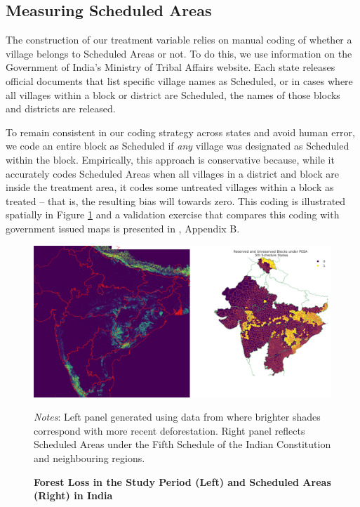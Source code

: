 \documentclass[12pt,reqno]{article}
\begin{document}
\subsection{Measuring Scheduled Areas} 

The construction of our treatment variable relies on manual coding of whether a village belongs to Scheduled Areas or not. To do this, we use information on the Government of India's Ministry of Tribal Affairs website. Each state releases official documents that list specific village names as Scheduled, or in cases where all villages within a block or district are Scheduled, the names of those blocks and districts are released.

To remain consistent in our coding strategy across states and avoid human error, we code an entire block as Scheduled if \emph{any} village was designated as Scheduled within the block. Empirically, this approach is conservative because, while it accurately codes Scheduled Areas when all villages in a district and block are inside the treatment area, it codes some untreated villages within a block as treated -- that is, the resulting bias will towards zero. This coding is illustrated spatially in Figure \ref{fig:schmap} and a validation exercise that compares this coding with government issued maps is presented in \textcite{gulzar2019}, Appendix B.

\begin{figure}[htbp!]
\begin{center}
\begin{minipage}{1 \linewidth}
\caption{\textbf{Forest Loss in the Study Period (Left) and Scheduled Areas (Right) in India}\label{fig:schmap}}	
\centerline{\includegraphics[width=6 in,angle=0]{Output/side_by_side.png}}
\smallskip
\normalsize
\emph{Notes}: Left panel generated using data from \textcite{Hansen2013-vk} where brighter shades correspond with more recent deforestation. Right panel reflects Scheduled Areas under the Fifth Schedule of the Indian Constitution and neighbouring regions.
\end{minipage}
\end{center}
\end{figure}
\end{document}
